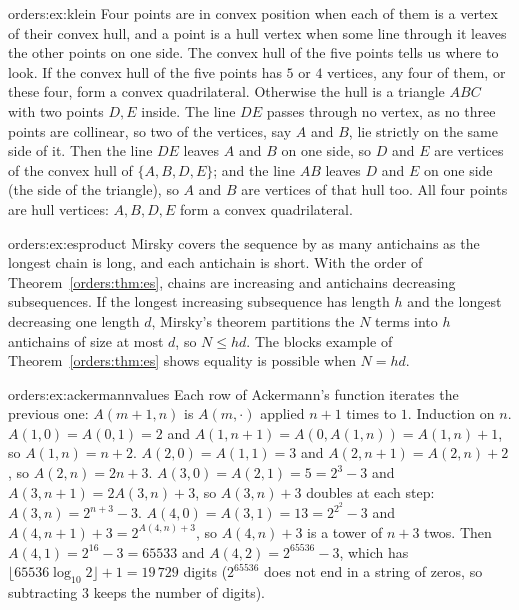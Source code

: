 \begin{solution}{orders:ex:klein}
\idea Four points are in convex position when each of them is a vertex of their convex hull, and a point is a hull vertex
when some line through it leaves the other points on one side. The convex hull of the five points tells us where to look.
\writeup If the convex hull of the five points has $5$ or $4$ vertices, any four of them, or these four, form a convex
quadrilateral. Otherwise the hull is a triangle $ABC$ with two points $D,E$ inside. The line $DE$ passes through no vertex, as no three
points are collinear, so two of the vertices, say $A$ and $B$, lie strictly on the same side of it. Then the line $DE$ leaves $A$ and $B$
on one side, so $D$ and $E$ are vertices of the convex hull of $\{A,B,D,E\}$; and the line $AB$ leaves $D$ and $E$ on one side (the side of
the triangle), so $A$ and $B$ are vertices of that hull too. All four points are hull vertices: $A,B,D,E$ form a convex
quadrilateral.
\end{solution}

\begin{solution}{orders:ex:esproduct}
\idea Mirsky covers the sequence by as many antichains as the longest chain is long, and each antichain is short.
\writeup With the order of Theorem~\ref{orders:thm:es}, chains are increasing and antichains decreasing subsequences. If the longest
increasing subsequence has length $h$ and the longest decreasing one length $d$, Mirsky's theorem partitions the $N$ terms into $h$
antichains of size at most $d$, so $N\le hd$. The blocks example of Theorem~\ref{orders:thm:es} shows equality is possible when $N=hd$.
\end{solution}

\begin{solution}{orders:ex:ackermannvalues}
\idea Each row of Ackermann's function iterates the previous one: $A(m+1,n)$ is $A(m,\cdot)$ applied $n+1$ times to $1$.
\writeup Induction on $n$. $A(1,0)=A(0,1)=2$ and $A(1,n+1)=A(0,A(1,n))=A(1,n)+1$, so $A(1,n)=n+2$. $A(2,0)=A(1,1)=3$ and
$A(2,n+1)=A(2,n)+2$, so $A(2,n)=2n+3$. $A(3,0)=A(2,1)=5=2^3-3$ and $A(3,n+1)=2A(3,n)+3$, so $A(3,n)+3$ doubles at each step:
$A(3,n)=2^{n+3}-3$. $A(4,0)=A(3,1)=13=2^{2^2}-3$ and $A(4,n+1)+3=2^{A(4,n)+3}$, so $A(4,n)+3$ is a tower of $n+3$ twos. Then
$A(4,1)=2^{16}-3=65533$ and $A(4,2)=2^{65536}-3$, which has $\lfloor65536\log_{10}2\rfloor+1=19\,729$ digits ($2^{65536}$ does not end in a string of
zeros, so subtracting $3$ keeps the number of digits).
\end{solution}

